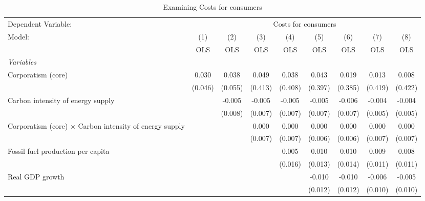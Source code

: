 
\begin{table}[htbp]
   \caption{Examining Costs for consumers}
   \centering
   \begin{tabular}{lcccccccc}
      \toprule
      Dependent Variable: & \multicolumn{8}{c}{Costs for consumers}\\
      Model:                                                         & (1)     & (2)     & (3)     & (4)     & (5)     & (6)     & (7)     & (8)\\  
                                                                     &  OLS    & OLS     & OLS     & OLS     & OLS     & OLS     & OLS     & OLS\\  
      \midrule
      \emph{Variables}\\
      Corporatism (core)                                             & 0.030   & 0.038   & 0.049   & 0.038   & 0.043   & 0.019   & 0.013   & 0.008\\   
                                                                     & (0.046) & (0.055) & (0.413) & (0.408) & (0.397) & (0.385) & (0.419) & (0.422)\\   
      Carbon intensity of energy supply                              &         & -0.005  & -0.005  & -0.005  & -0.005  & -0.006  & -0.004  & -0.004\\   
                                                                     &         & (0.008) & (0.007) & (0.007) & (0.007) & (0.007) & (0.005) & (0.005)\\   
      Corporatism (core) $\times$ Carbon intensity of energy supply  &         &         & 0.000   & 0.000   & 0.000   & 0.000   & 0.000   & 0.000\\   
                                                                     &         &         & (0.007) & (0.007) & (0.006) & (0.006) & (0.007) & (0.007)\\   
      Fossil fuel production per capita                              &         &         &         & 0.005   & 0.010   & 0.010   & 0.009   & 0.008\\   
                                                                     &         &         &         & (0.016) & (0.013) & (0.014) & (0.011) & (0.011)\\   
      Real GDP growth                                                &         &         &         &         & -0.010  & -0.010  & -0.006  & -0.005\\   
                                                                     &         &         &         &         & (0.012) & (0.012) & (0.010) & (0.010)\\   

\end{tabular}
\end{table}

